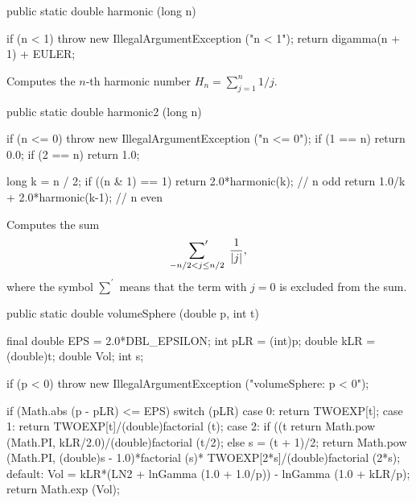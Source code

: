\begin{code}

   public static double harmonic (long n)\begin{hide} {
      if (n < 1)
         throw new IllegalArgumentException ("n < 1");
      return digamma(n + 1) + EULER;
   }\end{hide}
\end{code}
\begin{tabb} Computes the $n$-th harmonic number $H_n  = \sum_{j=1}^n 1/j$.
\end{tabb}
\begin{code}

   public static double harmonic2 (long n)\begin{hide} {
      if (n <= 0)
         throw new IllegalArgumentException ("n <= 0");
      if (1 == n)
         return 0.0;
      if (2 == n)
         return 1.0;

      long k = n / 2;
      if ((n & 1) == 1)
         return  2.0*harmonic(k);         // n odd
      return  1.0/k + 2.0*harmonic(k-1);  // n even
   }\end{hide}
\end{code}
\begin{tabb} Computes the sum
\[
\sideset{}{'}\sum_{-n/2<j\le n/2}\; \frac 1{|j|},
\]
 where the symbol $\sum^\prime$ means that the term with $j=0$ is excluded
 from the sum.
\end{tabb}
\begin{code}

   public static double volumeSphere (double p, int t)\begin{hide} {
      final double EPS = 2.0*DBL_EPSILON;
      int pLR = (int)p;
      double kLR = (double)t;
      double Vol;
      int s;

      if (p < 0)
         throw new IllegalArgumentException ("volumeSphere:   p < 0");

      if (Math.abs (p - pLR) <= EPS) {
         switch (pLR) {
         case 0:
            return TWOEXP[t];
         case 1:
            return TWOEXP[t]/(double)factorial (t);
         case 2:
            if ((t %
               return Math.pow (Math.PI, kLR/2.0)/(double)factorial (t/2);
            else {
               s = (t + 1)/2;
               return Math.pow (Math.PI, (double)s - 1.0)*factorial (s)*
                  TWOEXP[2*s]/(double)factorial (2*s);
            }
          default:
         }
      }
      Vol = kLR*(LN2 + lnGamma (1.0 + 1.0/p)) -
      lnGamma (1.0 + kLR/p);
      return Math.exp (Vol);
   }\end{hide}
\end{code}
